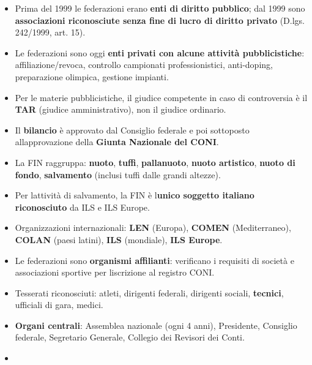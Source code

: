 \documentclass[a4paper,11pt]{article}
\providecommand{\tightlist}{%
  \setlength{\itemsep}{0pt}\setlength{\parskip}{0pt}}
\begin{document}
\begin{itemize}
      \tightlist
      \item
            Prima del 1999 le federazioni erano \textbf{enti di diritto pubblico};
            dal 1999 sono \textbf{associazioni riconosciute senza fine di lucro di
                  diritto privato} (D.lgs. 242/1999, art. 15).
      \item
            Le federazioni sono oggi \textbf{enti privati con alcune attività
                  pubblicistiche}: affiliazione/revoca, controllo campionati
            professionistici, anti-doping, preparazione olimpica, gestione
            impianti.
      \item
            Per le materie pubblicistiche, il giudice competente in caso di
            controversia è il \textbf{TAR} (giudice amministrativo), non il
            giudice ordinario.
      \item
            Il \textbf{bilancio} è approvato dal Consiglio federale e poi
            sottoposto all\textquotesingle approvazione della \textbf{Giunta
                  Nazionale del CONI}.
      \item
            La FIN raggruppa: \textbf{nuoto}, \textbf{tuffi}, \textbf{pallanuoto},
            \textbf{nuoto artistico}, \textbf{nuoto di fondo}, \textbf{salvamento}
            (inclusi tuffi dalle grandi altezze).
      \item
            Per l\textquotesingle attività di salvamento, la FIN è
            l\textquotesingle{}\textbf{unico soggetto italiano riconosciuto} da
            ILS e ILS Europe.
      \item
            Organizzazioni internazionali: \textbf{LEN} (Europa), \textbf{COMEN}
            (Mediterraneo), \textbf{COLAN} (paesi latini), \textbf{ILS}
            (mondiale), \textbf{ILS Europe}.
      \item
            Le federazioni sono \textbf{organismi affilianti}: verificano i
            requisiti di società e associazioni sportive per
            l\textquotesingle iscrizione al registro CONI.
      \item
            Tesserati riconosciuti: atleti, dirigenti federali, dirigenti sociali,
            \textbf{tecnici}, ufficiali di gara, medici.
      \item
            \textbf{Organi centrali}: Assemblea nazionale (ogni 4 anni),
            Presidente, Consiglio federale, Segretario Generale, Collegio dei
            Revisori dei Conti.
      \item

\end{itemize}
\end{document}
